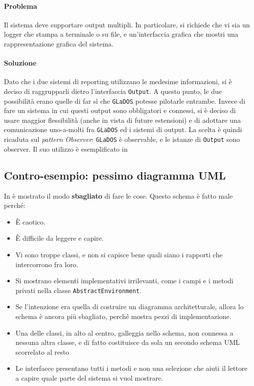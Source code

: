 \documentclass[a4paper,12pt]{report}
\begin{document}
\paragraph{Problema} Il sistema deve supportare output multipli. In particolare, si richiede che vi sia un logger che stampa a terminale o su file,
e un'interfaccia grafica che mostri una rappresentazione grafica del sistema.

\paragraph{Soluzione} Dato che i due sistemi di reporting utilizzano le medesime informazioni, si è deciso di raggrupparli dietro l'interfaccia \texttt{Output}.
A questo punto, le due possibilità erano quelle di far sì che \texttt{GLaDOS} potesse pilotarle entrambe.
Invece di fare un sistema in cui questi output sono obbligatori e connessi, si è deciso di usare maggior flessibilità (anche in vista di future estensioni)
e di adottare una comunicazione uno-a-molti fra \texttt{GLaDOS} ed i sistemi di output.
La scelta è quindi ricaduta sul \textit{pattern Observer}: \texttt{GLaDOS} è observable, e le istanze di \texttt{Output} sono observer.
%
Il suo utilizzo è esemplificato in 


\subsection*{Contro-esempio: pessimo diagramma UML}

In  è mostrato il modo \textbf{sbagliato} di fare le cose.
%
Questo schema è fatto male perché:
\begin{itemize}
	\item È caotico.
	\item È difficile da leggere e capire.
	\item Vi sono troppe classi, e non si capisce bene quali siano i rapporti che intercorrono fra loro.
	\item Si mostrano elementi implementativi irrilevanti, come i campi e i metodi privati nella classe \texttt{AbstractEnvironment}.
	\item Se l'intenzione era quella di costruire un diagramma architetturale, allora lo schema è ancora più sbagliato, perché mostra pezzi di implementazione.
	\item Una delle classi, in alto al centro, galleggia nello schema, non connessa a nessuna altra classe, e di fatto costituisce da sola un secondo schema UML scorrelato al resto
	\item Le interfacce presentano tutti i metodi e non una selezione che aiuti il lettore a capire quale parte del sistema si vuol mostrare.
\end{itemize}
\end{document}
